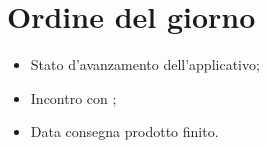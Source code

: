 \section{Ordine del giorno}
\begin{itemize}
\item Stato d'avanzamento dell'applicativo;
\item Incontro con \proponProg;
\item Data consegna prodotto finito.
\end{itemize}